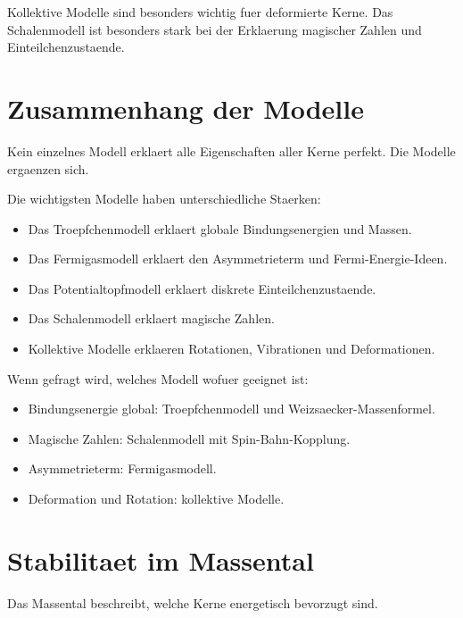 \begin{notebox}
Kollektive Modelle sind besonders wichtig fuer deformierte Kerne.
Das Schalenmodell ist besonders stark bei der Erklaerung magischer Zahlen und
Einteilchenzustaende.
\end{notebox}

\section{Zusammenhang der Modelle}

Kein einzelnes Modell erklaert alle Eigenschaften aller Kerne perfekt.
Die Modelle ergaenzen sich.

\begin{conceptbox}
Die wichtigsten Modelle haben unterschiedliche Staerken:
\begin{itemize}
    \item Das Troepfchenmodell erklaert globale Bindungsenergien und Massen.
    \item Das Fermigasmodell erklaert den Asymmetrieterm und Fermi-Energie-Ideen.
    \item Das Potentialtopfmodell erklaert diskrete Einteilchenzustaende.
    \item Das Schalenmodell erklaert magische Zahlen.
    \item Kollektive Modelle erklaeren Rotationen, Vibrationen und Deformationen.
\end{itemize}
\end{conceptbox}

\begin{examtipbox}
Wenn gefragt wird, welches Modell wofuer geeignet ist:
\begin{itemize}
    \item Bindungsenergie global: Troepfchenmodell und Weizsaecker-Massenformel.
    \item Magische Zahlen: Schalenmodell mit Spin-Bahn-Kopplung.
    \item Asymmetrieterm: Fermigasmodell.
    \item Deformation und Rotation: kollektive Modelle.
\end{itemize}
\end{examtipbox}

\section{Stabilitaet im Massental}

Das Massental beschreibt, welche Kerne energetisch bevorzugt sind.


